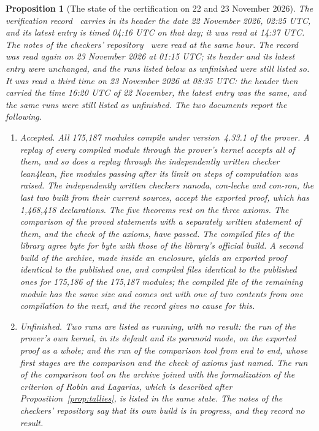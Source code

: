 \documentclass[11pt]{article}
\newtheorem{proposition}[theorem]{Proposition}
\theoremstyle{definition}
\theoremstyle{remark}
\begin{document}
\begin{proposition}[The state of the certification on 22 and 23 November 2026]\label{prop:state}
The verification record~\citep{sutherland} carries in its header the date 22 November 2026, 02:25 UTC, and its latest entry is timed 04:16 UTC on that day; it was read at 14:37 UTC. The notes of the checkers' repository~\citep{leannotes} were read at the same hour. The record was read again on 23 November 2026 at 01:15 UTC; its header and its latest entry were unchanged, and the runs listed below as unfinished were still listed so. It was read a third time on 23 November 2026 at 08:35 UTC: the header then carried the time 16:20 UTC of 22 November, the latest entry was the same, and the same runs were still listed as unfinished. The two documents report the following.
\begin{enumerate}[leftmargin=2em,itemsep=1pt]
\item \emph{Accepted.} All 175{,}187 modules compile under version~4.33.1 of the prover. A replay of every compiled module through the prover's kernel accepts all of them, and so does a replay through the independently written checker lean4lean, five modules passing after its limit on steps of computation was raised. The independently written checkers nanoda, con-leche and con-ron, the last two built from their current sources, accept the exported proof, which has 1{,}468{,}418 declarations. The five theorems rest on the three axioms. The comparison of the proved statements with a separately written statement of them, and the check of the axioms, have passed. The compiled files of the library agree byte for byte with those of the library's official build. A second build of the archive, made inside an enclosure, yields an exported proof identical to the published one, and compiled files identical to the published ones for 175{,}186 of the 175{,}187 modules; the compiled file of the remaining module has the same size and comes out with one of two contents from one compilation to the next, and the record gives no cause for this.
\item \emph{Unfinished.} Two runs are listed as running, with no result: the run of the prover's own kernel, in its default and its paranoid mode, on the exported proof as a whole; and the run of the comparison tool from end to end, whose first stages are the comparison and the check of axioms just named. The run of the comparison tool on the archive joined with the formalization of the criterion of Robin and Lagarias, which is described after Proposition~\ref{prop:tallies}, is listed in the same state. The notes of the checkers' repository say that its own build is in progress, and they record no result.

\end{enumerate}
\end{proposition}
\end{document}
